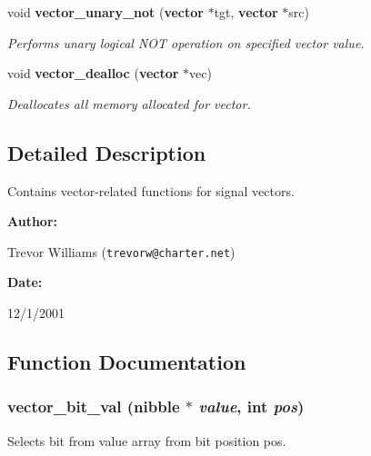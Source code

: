 \begin{CompactItemize}
void {\bf vector\_\-unary\_\-not} ({\bf vector} $\ast$tgt, {\bf vector} $\ast$src)
\begin{CompactList}\small\item\em Performs unary logical NOT operation on specified vector value.\item\end{CompactList}\item 
void {\bf vector\_\-dealloc} ({\bf vector} $\ast$vec)
\begin{CompactList}\small\item\em Deallocates all memory allocated for vector.\item\end{CompactList}\end{CompactItemize}


\subsection{Detailed Description}
Contains vector-related functions for signal vectors.



\begin{Desc}
\item[{\bf Author: }]\par
Trevor Williams ({\tt trevorw@charter.net}) \end{Desc}
\begin{Desc}
\item[{\bf Date: }]\par
12/1/2001

\end{Desc}


\subsection{Function Documentation}
\subsubsection{ vector\_\-bit\_\-val ({\bf nibble} $\ast$ {\em value}, int {\em pos})}\label{vector_8h_a10}


Selects bit from value array from bit position pos.

